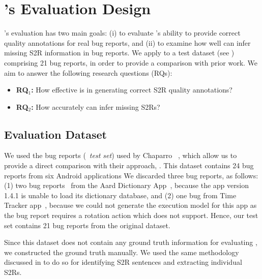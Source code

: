 
\section{\tool's Evaluation Design}
\label{sec:empirical_evaluation}
\tool's evaluation has two main goals: (i) to evaluate \tool's ability to provide correct quality annotations for real bug reports, 
and (ii) to examine how well \tool can infer missing S2R information in bug reports. 
We apply \tool to a test dataset (see ) comprising 21 bug reports, in order to provide a comparison with prior work. We aim to answer the following research questions (RQs):
\begin{itemize}
	\item \textbf{RQ$_{1}$:} How effective is \tool in generating correct S2R quality annotations?
	\item \textbf{RQ$_{2}$:} How accurately can \tool infer missing S2Rs?
\end{itemize}

\subsection{Evaluation Dataset}
\label{sec:test_dataset}

We used the bug reports (\ie\ \textit{test set}) used by Chaparro \etal~\cite{Chaparro2019}, which allow us to provide a direct comparison with their approach, \EulerC. 
This dataset contains 24 bug reports  from six Android applications   
We discarded three bug reports, as follows: (1) two bug reports~\cite{aard81, aard104} from the Aard Dictionary App~\cite{aardapp}, because the app version 1.4.1 is unable to load its dictionary database, and (2) one bug from Time Tracker app~\cite{atimetracker1}, because we could not generate the execution model for this app as the bug report requires a rotation action which \tool does not support.
Hence, our test set contains 21 bug reports from the original \EulerC dataset. 

Since this dataset does not contain any ground truth information for evaluating \tool, we constructed the ground truth manually.  We used the same methodology discussed in  to do so for identifying S2R sentences and extracting individual S2Rs.

